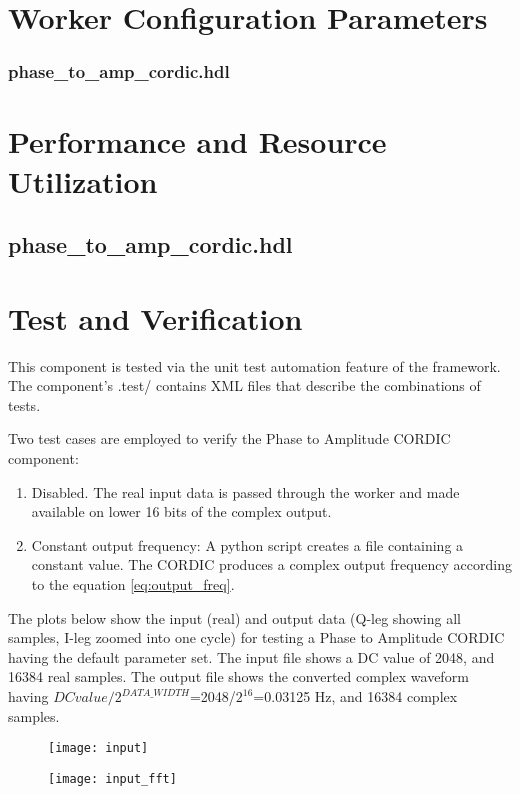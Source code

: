\documentclass{article}
\def\comp{phase\_to\_amp\_cordic}
\edef\ecomp{phase_to_amp_cordic}
\begin{document}
\begin{landscape}
\section*{Worker Configuration Parameters}
\subsubsection*{\comp.hdl}
%
\section*{Performance and Resource Utilization}
\subsection*{\comp.hdl}
%
\end{landscape}
\newpage

\section*{Test and Verification}
This component is tested via the unit test automation feature of the framework.  The component's .test/ contains XML files that describe the combinations of tests.\medskip

Two test cases are employed to verify the Phase to Amplitude CORDIC component:

\begin{enumerate}
	\item Disabled. The real input data is passed through the worker and made available on lower 16 bits of the complex output.
	\item Constant output frequency: A python script creates a file containing a constant value. The CORDIC produces a complex output frequency according to the equation \ref{eq:output_freq}.
\end{enumerate}

The plots below show the input (real) and output data (Q-leg showing all samples, I-leg zoomed into one cycle) for testing a Phase to Amplitude CORDIC having the default parameter set. The input file shows a DC value of 2048, and 16384 real samples.  The output file shows the converted complex waveform having $DC value/2^{DATA\_WIDTH}$=2048/$2^{16}$=0.03125 Hz, and 16384 complex samples.

\begin{figure}[ht]
	\centering
	\begin{minipage}{.5\textwidth}
		\centering\texttt{[image: input]}
		\label{fig:input_tdomain}
	\end{minipage}%
	\begin{minipage}{.5\textwidth}
		\centering\texttt{[image: input\_fft]}
		\label{fig:input_fdomain}
	\end{minipage}
\end{figure}
\end{document}
